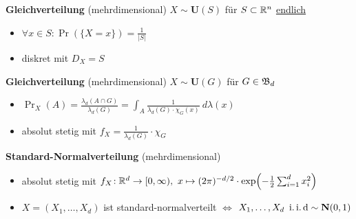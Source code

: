 \textbf{Gleichverteilung} (mehrdimensional) $X\sim\mathbf{U}(S)$ für $S\subset\mathbb{R}^n$
\underline{endlich}
\begin{itemize}
\item $\forall x\in S\!: \Pr(\{X=x\}) = \frac{1}{|S|}$

\item diskret mit $D_X = S$
\end{itemize}

\textbf{Gleichverteilung} (mehrdimensional) $X\sim\mathbf{U}(G)$ für $G\in\mathfrak{B}_d$
\begin{itemize}
\item $\Pr_X(A) = \frac{\lambda_d(A\cap G)}{\lambda_d(G)} =
  \int_A \frac{1}{\lambda_d(G) \cdot \chi_G(x)}~d\lambda(x)$

\item absolut stetig mit $f_X = \frac{1}{\lambda_d(G)} \cdot \chi_G$
\end{itemize}

\textbf{Standard-Normalverteilung} (mehrdimensional)
\begin{itemize}
\item absolut stetig mit
  $f_X\!: \R^d \to [0,\infty),\
  x \mapsto (2\pi)^{-d/2} \cdot \exp\left(-\frac{1}{2} \sum_{i=1}^{d}x_i^2\right)$

\item $X = (X_1,\ldots,X_d)$ ist standard-normalverteilt
  $\Leftrightarrow$ $X_1,\ldots,X_d\ \operatorname{i.i.d} \sim\mathbf{N}(0,1)$
\end{itemize}
